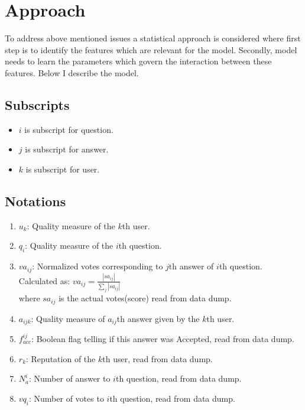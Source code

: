 \documentclass{article}
\begin{document}
\section{Approach}
To address above mentioned issues a statistical approach is considered 
where first step is to identify the features which are relevant for the model.
Secondly, model needs to learn the parameters which govern the interaction
between these features.
Below I describe the model.
\subsection{Subscripts}
\begin{itemize}
    \item $i$ is subscript for question.
    \item $j$ is subscript for answer.
    \item $k$ is subscript for user.
\end{itemize}
\subsection{Notations}
\begin{enumerate}
    \item $u_k$: Quality measure of the $k$th user.
    \item $q_i$: Quality measure of the $i$th question.
    \item $va_{ij}$: Normalized votes corresponding to $j$th answer of $i$th question. \\
        Calculated as: $va_{ij} = \frac{|sa_{ij}|}{\sum_{j} |sa_{ij}|}$ \\
        where $sa_{ij}$ is the actual votes(score) read from data dump.
    \item $a_{ijk}$: Quality measure of $a_{ij}$th answer given by the $k$th user.
    \item $f_{acc}^{ij}$: Boolean flag telling if this answer was Accepted, read from data dump.
    \item $r_k$: Reputation of the $k$th user, read from data dump.
    \item $N_{a}^{i}$: Number of answer to $i$th question, read from data dump.
    \item $vq_{i}$: Number of votes to $i$th question, read from data dump.
\end{enumerate}
\end{document}
